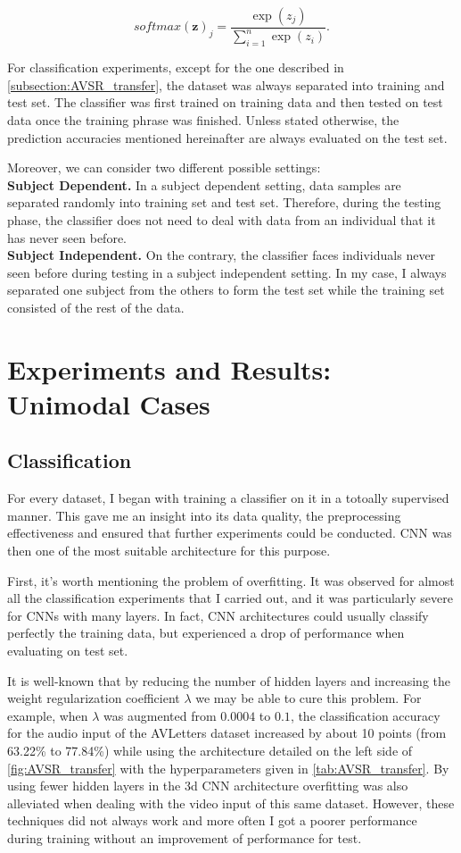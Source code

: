 \[softmax(\mathbf{z})_j = \frac{\exp(z_j)}{\sum_{i=1}^n\exp(z_i)}.\]

For classification experiments, except for the one described in
\ref{subsection:AVSR_transfer}, the dataset was always separated into
training and test set. The classifier was first trained on training data
and then tested on test data once the training phrase was finished.
Unless stated otherwise, the prediction accuracies mentioned hereinafter
are always evaluated on the test set.

Moreover, we can consider two different possible settings:\\[0.25em]
\textbf{Subject Dependent.}
In a subject dependent setting, data samples are separated randomly into
training set and test set. Therefore, during the
testing phase, the classifier does not need to deal with data from an
individual that it has never seen before.\\[0.25em]
\textbf{Subject Independent.}
On the contrary, the classifier faces individuals never seen before
during testing in a subject independent setting. 
In my case, I always separated one subject from the others to form
the test set while the training set consisted of the rest of the data.

\section{Experiments and Results: Unimodal Cases} \label{section:uni}

\subsection{Classification} \label{subsection:classif}

For every dataset, I began with training a classifier on it in a
totoally supervised manner.
This gave me an insight into its data quality, the preprocessing
effectiveness and ensured that further experiments could be conducted.
CNN was then one of the most suitable architecture for this purpose.

First, it's worth mentioning the problem of overfitting.
It was observed for almost all the classification experiments that I
carried out, and it was particularly severe for CNNs with many layers.
In fact, CNN architectures could usually classify
perfectly the training data, but experienced a drop of performance
when evaluating on test set.

It is well-known that by reducing the number of hidden layers and
increasing the weight regularization coefficient $\lambda$ we may
be able to cure this problem.
For example, when $\lambda$ was augmented from $0.0004$ to $0.1$,
the classification accuracy for the audio input of the AVLetters
dataset increased by about 10 points
(from 63.22\% to 77.84\%) while using the architecture detailed on
the left side of \autoref{fig:AVSR_transfer} with the hyperparameters
given in \autoref{tab:AVSR_transfer}.
By using fewer hidden layers in the 3d CNN architecture overfitting
was also alleviated when dealing with the video input of this same dataset.
However, these techniques did not always work
and more often I got a poorer performance during training without
an improvement of performance for test.

